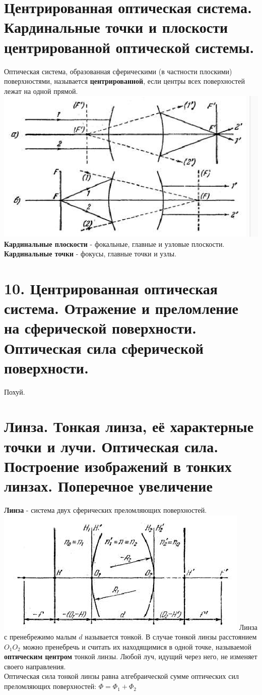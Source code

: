 \documentclass[14pt]{extarticle}
\begin{document}
\section{Центрированная оптическая система. Кардинальные точки и плоскости
центрированной оптической системы.}
Оптическая система, образованная сферическими (в частности
плоскими) поверхностями, называется \textbf{центрированной}, 
если центры всех поверхностей лежат на одной прямой. 
\includegraphics{optic_system.png}
\textbf{Кардинальные плоскости} - фокальные, главные и 
узловые плоскости.
\textbf{Кардинальные точки} - фокусы, главные точки и узлы.
\section{10. Центрированная оптическая система. Отражение и преломление на сферической
поверхности. Оптическая сила сферической поверхности.}
Похуй.
\section{Линза. Тонкая линза, её характерные точки и лучи. Оптическая сила. Построение
изображений в тонких линзах. Поперечное увеличение}
\textbf{Линза} - система двух сферических преломляющих 
поверхностей. 
\includegraphics{lense.png}
Линза с пренебрежимо малым $d$ называется тонкой. В случае тонкой
линзы расстоянием $O_1 O_2$ можно пренебречь и считать их
находящимися в одной точке, называемой 
\textbf{оптическим центром} тонкой линзы. Любой луч, идущий
через него, не изменяет своего направления.\\
Оптическая сила тонкой линзы равна алгебраической сумме 
оптических сил преломляющих поверхностей:
$\Phi = \Phi_1 + \Phi_2$\\
\end{document}
